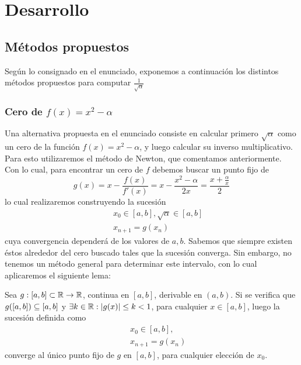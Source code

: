 \section{Desarrollo}
	\subsection{Métodos propuestos}
	
	Según lo consignado en el enunciado, exponemos a continuación los distintos métodos propuestos para computar $\frac{1}{\sqrt{\alpha}}$
		\subsubsection{Cero de $f(x) = x^2 -\alpha$}
		Una alternativa propuesta en el enunciado consiste en calcular primero $\sqrt{\alpha}$ como un cero de la función $f(x) = x^2 -\alpha$, y luego calcular su inverso multiplicativo. Para esto utilizaremos el método de Newton, que comentamos anteriormente. Con lo cual, para encontrar un cero de $f$ debemos buscar un punto fijo de 
		\begin{equation}
			g(x) = x - \frac{f(x)}{f'(x)} = x - \frac{x^2 - \alpha}{2x} = \frac{x + \frac{\alpha}{x}}{2}
		\label{g}	
		\end{equation}
lo cual realizaremos construyendo la sucesión
	\begin{eqnarray}
		&& x_0 \in [a,b], \sqrt{\alpha} \in [a,b] \nonumber \\
		&& x_{n+1} = g(x_n) \nonumber
	\end{eqnarray}
cuya convergencia dependerá de los valores de $a,b$. Sabemos que siempre existen éstos alrededor del cero buscado tales que la sucesión converga. Sin embargo, no tenemos un método general para determinar este intervalo, con lo cual aplicaremos el siguiente lema:
\begin{lema}
Sea $g: [a,b] \subset \mathbb{R} \rightarrow \mathbb{R}$, continua en $[a,b]$, derivable en $(a,b)$. Si se verifica que $g([a,b]) \subseteq [a,b]$ y $\exists k \in\mathbb{R} : |g(x)| \leq k < 1$, para cualquier $x\in [a,b]$, luego la sucesión definida como 
	\begin{eqnarray}
		&& x_0 \in [a,b], \nonumber \\
		&& x_{n+1} = g(x_n) \nonumber
	\end{eqnarray}
	converge al único punto fijo de $g$ en $[a,b]$, para cualquier elección de $x_0$.
\label{lema_f}
\end{lema}
